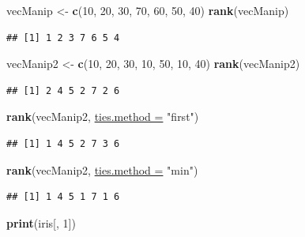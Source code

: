\documentclass[twoside,symmetric]{book}
\newenvironment{Shaded}{}{}
\newcommand{\DataTypeTok}[1]{\underline{#1}}
\newcommand{\DecValTok}[1]{#1}
\newcommand{\KeywordTok}[1]{\textbf{#1}}
\newcommand{\NormalTok}[1]{#1}
\newcommand{\StringTok}[1]{#1}
\begin{document}
\begin{Shaded}
\begin{Highlighting}[]
\NormalTok{vecManip <-}\StringTok{ }\KeywordTok{c}\NormalTok{(}\DecValTok{10}\NormalTok{, }\DecValTok{20}\NormalTok{, }\DecValTok{30}\NormalTok{, }\DecValTok{70}\NormalTok{, }\DecValTok{60}\NormalTok{, }\DecValTok{50}\NormalTok{, }\DecValTok{40}\NormalTok{)}
\KeywordTok{rank}\NormalTok{(vecManip)}
\end{Highlighting}
\end{Shaded}

\begin{verbatim}
## [1] 1 2 3 7 6 5 4
\end{verbatim}

\begin{Shaded}
\begin{Highlighting}[]
\NormalTok{vecManip2 <-}\StringTok{ }\KeywordTok{c}\NormalTok{(}\DecValTok{10}\NormalTok{, }\DecValTok{20}\NormalTok{, }\DecValTok{30}\NormalTok{, }\DecValTok{10}\NormalTok{, }\DecValTok{50}\NormalTok{, }\DecValTok{10}\NormalTok{, }\DecValTok{40}\NormalTok{)}
\KeywordTok{rank}\NormalTok{(vecManip2)}
\end{Highlighting}
\end{Shaded}

\begin{verbatim}
## [1] 2 4 5 2 7 2 6
\end{verbatim}

\begin{Shaded}
\begin{Highlighting}[]
\KeywordTok{rank}\NormalTok{(vecManip2, }\DataTypeTok{ties.method =} \StringTok{"first"}\NormalTok{)}
\end{Highlighting}
\end{Shaded}

\begin{verbatim}
## [1] 1 4 5 2 7 3 6
\end{verbatim}

\begin{Shaded}
\begin{Highlighting}[]
\KeywordTok{rank}\NormalTok{(vecManip2, }\DataTypeTok{ties.method =} \StringTok{"min"}\NormalTok{)}
\end{Highlighting}
\end{Shaded}

\begin{verbatim}
## [1] 1 4 5 1 7 1 6
\end{verbatim}

\begin{Shaded}
\begin{Highlighting}[]
\KeywordTok{print}\NormalTok{(iris[, }\DecValTok{1}\NormalTok{])}
\end{Highlighting}
\end{Shaded}
\end{document}

